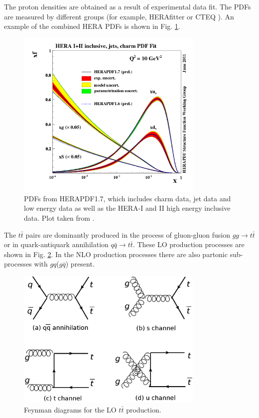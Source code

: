 The proton densities are obtained as a result of experimental data fit.
The PDFs are measured by different groups (for example, HERAfitter \cite{Alekhin:2014irh} or 
CTEQ \cite{Pumplin:2002vw}). An example of the combined HERA PDFs is shown in Fig. \ref{fig:HERA_PDF}.

\begin{figure}[t]
  \centering
  \includegraphics[width=0.8\textwidth]{01_Theory_SM/plots/herapdf17.png}
  \caption{PDFs from HERAPDF1.7, which includes charm data, jet data and low energy data as well as the HERA-I and II high energy inclusive data. Plot taken from \cite{CooperSarkar:2011aa}.}
  \label{fig:HERA_PDF}
\end{figure}

The $t\bar{t}$ pairs are dominantly produced in the process of gluon-gluon fusion $gg \rightarrow t\bar{t}$ or in quark-antiquark annihilation $q\bar{q} \rightarrow t\bar{t}$.
These LO production processes are shown in Fig. \ref{fig:LO_tt_prod}. In the NLO production processes there are also partonic sub-processes with $gq$($g\bar{q}$) present.

\begin{figure}[h]
  \centering
  \includegraphics[width=0.8\textwidth]{01_Theory_SM/plots/LO_tt_production_uniform.png}
  \caption{Feynman diagrams for the LO $t\bar{t}$ production.}
  \label{fig:LO_tt_prod}
\end{figure}

